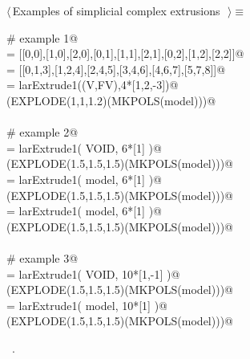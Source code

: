\documentclass[11pt,oneside]{article}	%
\begin{document}
\begin{flushleft} \small \label{scrap5}
$\langle\,$Examples of simplicial complex extrusions\nobreak\ {\footnotesize {}}$\,\rangle\equiv$
\vspace{-1ex}
\begin{list}{}{} \item
\mbox{}\verb@# example 1@\\
\mbox{}\verb@V = [[0,0],[1,0],[2,0],[0,1],[1,1],[2,1],[0,2],[1,2],[2,2]]@\\
\mbox{}\verb@FV = [[0,1,3],[1,2,4],[2,4,5],[3,4,6],[4,6,7],[5,7,8]]@\\
\mbox{}\verb@model = larExtrude1((V,FV),4*[1,2,-3])@\\
\mbox{}\verb@VIEW(EXPLODE(1,1,1.2)(MKPOLS(model)))@\\
\mbox{}\verb@@\\
\mbox{}\verb@# example 2@\\
\mbox{}\verb@model = larExtrude1( VOID, 6*[1] )@\\
\mbox{}\verb@VIEW(EXPLODE(1.5,1.5,1.5)(MKPOLS(model)))@\\
\mbox{}\verb@model = larExtrude1( model, 6*[1] )@\\
\mbox{}\verb@VIEW(EXPLODE(1.5,1.5,1.5)(MKPOLS(model)))@\\
\mbox{}\verb@model = larExtrude1( model, 6*[1] )@\\
\mbox{}\verb@VIEW(EXPLODE(1.5,1.5,1.5)(MKPOLS(model)))@\\
\mbox{}\verb@@\\
\mbox{}\verb@# example 3@\\
\mbox{}\verb@model = larExtrude1( VOID, 10*[1,-1] )@\\
\mbox{}\verb@VIEW(EXPLODE(1.5,1.5,1.5)(MKPOLS(model)))@\\
\mbox{}\verb@model = larExtrude1( model, 10*[1] )@\\
\mbox{}\verb@VIEW(EXPLODE(1.5,1.5,1.5)(MKPOLS(model)))@\\
\mbox{}\verb@@{\NWsep}
\end{list}
\vspace{-1ex}
\footnotesize\addtolength{\baselineskip}{-1ex}
\begin{list}{}{\setlength{\itemsep}{-\parsep}\setlength{\itemindent}{-\leftmargin}}
\item \NWtxtMacroRefIn\ .
\end{list}
\end{flushleft}
\end{document}

